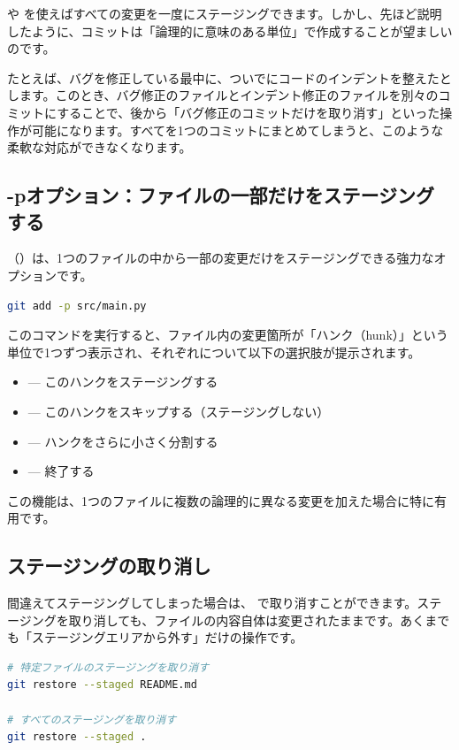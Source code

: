  や  を使えばすべての変更を一度にステージングできます。しかし、先ほど説明したように、コミットは「論理的に意味のある単位」で作成することが望ましいのです。

たとえば、バグを修正している最中に、ついでにコードのインデントを整えたとします。このとき、バグ修正のファイルとインデント修正のファイルを別々のコミットにすることで、後から「バグ修正のコミットだけを取り消す」といった操作が可能になります。すべてを1つのコミットにまとめてしまうと、このような柔軟な対応ができなくなります。

\subsection{-pオプション：ファイルの一部だけをステージングする}

（）は、1つのファイルの中から一部の変更だけをステージングできる強力なオプションです。

\begin{lstlisting}[language=bash]
git add -p src/main.py
\end{lstlisting}

このコマンドを実行すると、ファイル内の変更箇所が「ハンク（hunk）」という単位で1つずつ表示され、それぞれについて以下の選択肢が提示されます。

\begin{itemize}
  \item {} — このハンクをステージングする
  \item {} — このハンクをスキップする（ステージングしない）
  \item {} — ハンクをさらに小さく分割する
  \item {} — 終了する
\end{itemize}

この機能は、1つのファイルに複数の論理的に異なる変更を加えた場合に特に有用です。

\subsection{ステージングの取り消し}

間違えてステージングしてしまった場合は、 で取り消すことができます。ステージングを取り消しても、ファイルの内容自体は変更されたままです。あくまでも「ステージングエリアから外す」だけの操作です。

\begin{lstlisting}[language=bash]
# 特定ファイルのステージングを取り消す
git restore --staged README.md

# すべてのステージングを取り消す
git restore --staged .
\end{lstlisting}

